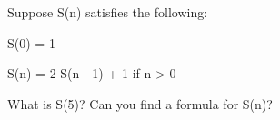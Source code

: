 Suppose S(n) satisfies the following:



S(0) = 1



S(n) = 2 S(n - 1) + 1 if n > 0



What is S(5)? Can you find a formula for S(n)?

